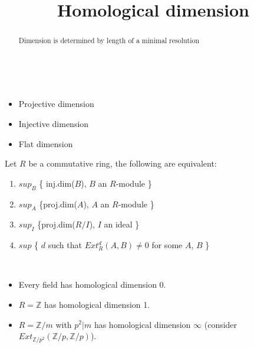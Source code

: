 \documentclass{ximera}
\title{Homological dimension}
\begin{document}
\begin{abstract}
  Dimension is determined by length of a minimal resolution
\end{abstract}
\maketitle

\begin{definition}
  \ 
  \begin{itemize}
  \item Projective dimension
  \item Injective dimension
  \item Flat dimension
  \end{itemize}
\end{definition}

\begin{theorem}
  Let $R$ be a commutative ring, the following are equivalent:
  \begin{enumerate}
  \item $sup_{B}$ \{ inj.dim($B$), $B$ an $R$-module \}
  \item $sup_{A}$ \{proj.dim($A$), $A$ an $R$-module \}
  \item $sup_{I}$ \{proj.dim($R/I$), $I$ an ideal \}
  \item $sup$ \{ $d$ such that $Ext^d_R(A,B) \not= 0$ for some $A$, $B$ \}
  \end{enumerate}
\end{theorem}

\begin{example}
  \ 
  \begin{itemize}
  \item Every field has homological dimension 0.
  \item $R = \mathbb{Z}$ has homological dimension 1.
  \item $R = \mathbb{Z}/m$ with $p^2 | m$ has homological dimension
    $\infty$ (consider $Ext_{\mathbb{Z}/p^2}(\mathbb{Z}/p, \mathbb{Z}/p)$).
  \end{itemize}
\end{example}
\end{document}
